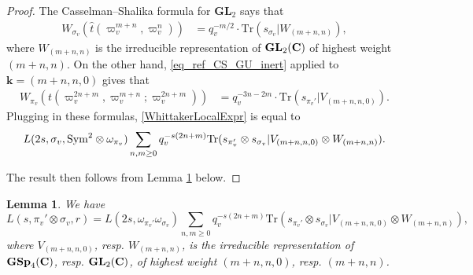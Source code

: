 \documentclass[11pt, reqno]{amsart}
\theoremstyle{plain}
\newtheorem{lemma}[theorem]{Lemma}
\theoremstyle{definition}
\theoremstyle{remark}
\theoremstyle{plain}
\def\C{{\bf C}}
\def\GSp{{\mathbf{GSp}}}
\def\GL{\mathbf{GL}}
\begin{document}
\begin{proof}
The Casselman--Shalika formula for $\GL_2$ says that \begin{align*}
    W_{\sigma_v}(\hat{t}(\varpi_v^{m+n},\varpi_v^n)) &=q_v^{-m/2}\cdot  \mathrm{Tr}(s_{\sigma_v}|W_{(m+n,n)}),
\end{align*} 
where $W_{(m+n,n)}$ is the irreducible representation of $\GL_2(\C)$ of highest weight $(m+n,n)$. On the other hand, \eqref{eq_ref_CS_GU_inert} applied to $\mathbf{k}=(m+n,n,0)$ gives that \begin{align*}
     W_{\pi_v}(t(\varpi_v^{2n+m},\varpi_v^{m+n};\varpi_v^{2n+m})) &= q_v^{-3n-2m}\cdot \mathrm{Tr}(s_{\pi_v'}|V_{(m+n,n,0)}).
\end{align*} 
Plugging in these formulas, \eqref{WhittakerLocalExpr} is equal to
\begin{align*} L(2s, \sigma_v, {\rm Sym}^2\otimes \omega_{\pi_v} )   \sum_{n,m \geq 0} q_v^{-s(2n+m)} \mathrm{Tr}(s_{\pi_v'} \otimes s_{\sigma_v}|V_{(m+n,n,0)} \otimes W_{(m+n,n)}).
\end{align*}

The result then follows from Lemma \ref{SymmetricAlgFact} below. 
\end{proof}


\begin{lemma}\label{SymmetricAlgFact}
We have 
\[L(s,\pi_v' \otimes \sigma_v, r) = L(2s,\omega_{\pi_v'}\omega_{\sigma_v}) \sum_{n,m \geq 0} q_v^{-s(2n+m)} \mathrm{Tr}(s_{\pi_v'} \otimes s_{\sigma_v}|V_{(m+n,n,0)} \otimes W_{(m+n,n)}),\]
where $V_{(m+n,n,0)} $, resp.  $W_{(m+n,n)}$, is the irreducible representation of $\GSp_4(\C)$, resp. $ \GL_2(\C)$, of highest weight $(m+n,n,0)$, resp. $(m+n,n)$. 
\end{lemma}
\end{document}
